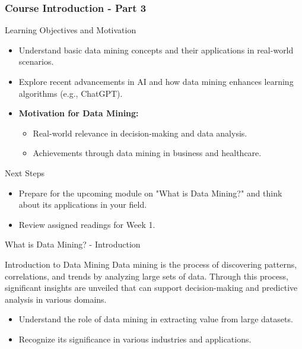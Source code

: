 \documentclass[aspectratio=169]{beamer}
\begin{document}
\begin{frame}[fragile]
    \frametitle{Course Introduction - Part 3}
    \begin{block}{Learning Objectives and Motivation}
        \begin{itemize}
            \item Understand basic data mining concepts and their applications in real-world scenarios.
            \item Explore recent advancements in AI and how data mining enhances learning algorithms (e.g., ChatGPT).
            \item \textbf{Motivation for Data Mining:}
                \begin{itemize}
                    \item Real-world relevance in decision-making and data analysis.
                    \item Achievements through data mining in business and healthcare.
                \end{itemize}
        \end{itemize}
    \end{block}

    \begin{block}{Next Steps}
        \begin{itemize}
            \item Prepare for the upcoming module on "What is Data Mining?" and think about its applications in your field.
            \item Review assigned readings for Week 1.
        \end{itemize}
    \end{block}
\end{frame}

\begin{frame}[fragile]{What is Data Mining? - Introduction}
    \begin{block}{Introduction to Data Mining}
        Data mining is the process of discovering patterns, correlations, and trends by analyzing large sets of data. Through this process, significant insights are unveiled that can support decision-making and predictive analysis in various domains.
    \end{block}

    \begin{itemize}
        \item Understand the role of data mining in extracting value from large datasets.
        \item Recognize its significance in various industries and applications.
    \end{itemize}
\end{frame}
\end{document}

